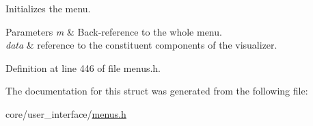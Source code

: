 Initializes the menu. 


\begin{DoxyParams}{Parameters}
{\em m} & Back-\/reference to the whole menu. \\
\hline
{\em data} & reference to the constituent components of the visualizer. \\
\hline
\end{DoxyParams}


Definition at line 446 of file menus.\+h.



The documentation for this struct was generated from the following file\+:\begin{DoxyCompactItemize}
\item 
core/user\+\_\+interface/\hyperlink{menus_8h}{menus.\+h}\end{DoxyCompactItemize}
